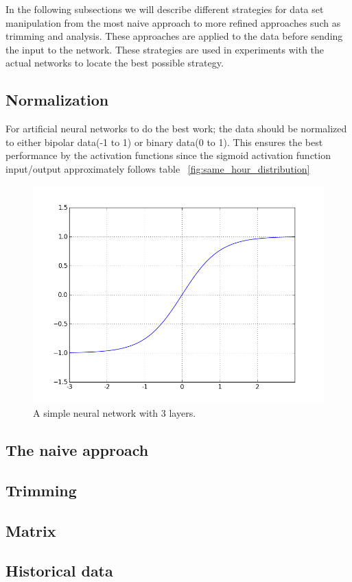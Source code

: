 In the following subsections we will describe different strategies for data set manipulation from the most naive approach to more refined approaches such as trimming and analysis. These approaches are applied to the data before sending the input to the network. These strategies are used in experiments with the actual networks to locate the best possible strategy.

\subsection{Normalization}
For artificial neural networks to do the best work; the data should be normalized to either bipolar data(-1 to 1) or binary data(0 to 1). This ensures the best performance by the activation functions since the sigmoid activation function input/output approximately follows table ~\ref{fig:same_hour_distribution}
\begin{figure}[!ht]
\centering
\includegraphics[width=0.8\linewidth,natwidth=898,natheight=587]{billeder/activationFunctions/tanh.png}
\caption{A simple neural network with 3 layers. \cite{stockForecasting}}
\label{fig:ANN}
\end{figure}

\subsection{The naive approach}

\subsection{Trimming}

\subsection{Matrix}

\subsection{Historical data}